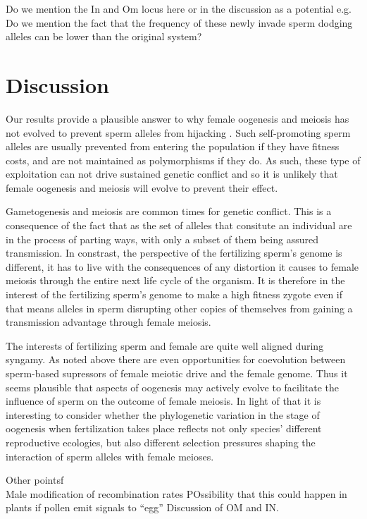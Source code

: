 \documentclass[12pt,letterpaper]{article}
\newcommand{\gc}[1]{{ \color{red} #1}}
\begin{document}
\gc{Do we mention the In and Om locus here or in the discussion as a
	 potential e.g. Do we mention the fact that the frequency of these
	 newly invade sperm dodging alleles can be lower than the original system?}\\

\section*{Discussion}

Our results provide a plausible answer to why female oogenesis and meiosis has
not evolved to prevent sperm alleles from hijacking . 
Such self-promoting sperm alleles are usually prevented from 
entering the population if they have fitness costs, and are not
maintained as polymorphisms if they do. As such, these type of
exploitation can not drive sustained genetic conflict and so it is unlikely
that female oogenesis and meiosis will evolve to prevent their effect. 


Gametogenesis and meiosis are common times for genetic conflict. This
is a consequence of the fact that as the set of alleles that consitute
an individual are in the process of parting ways, 
with only a subset of them being assured transmission.
In constrast, the perspective of the fertilizing sperm's genome is different, it has to live with the consequences of any distortion it causes 
to female meiosis through the entire next life cycle of the organism. 
It is therefore in the interest of the fertilizing sperm's genome to
make a high fitness zygote even if that means alleles in sperm
disrupting other copies of themselves from gaining a 
transmission advantage through female meiosis.
  
The interests of fertilizing sperm and female are quite well aligned during
syngamy. As noted above there are even opportunities for coevolution
between sperm-based supressors of female meiotic drive and the female genome.
 Thus it seems plausible that aspects of oogenesis may actively 
evolve to facilitate the influence of sperm on the outcome of female meiosis.
In light of that it is interesting to consider whether the phylogenetic variation
in the stage of oogenesis when fertilization takes place reflects not
only species' different reproductive ecologies, but also different
selection pressures shaping the interaction of sperm alleles with
female meioses. 


\gc{Other pointsf}\\

 Male modification of recombination rates
POssibility that this could happen in plants if pollen emit signals to ``egg''
Discussion of OM and IN.
\end{document}
